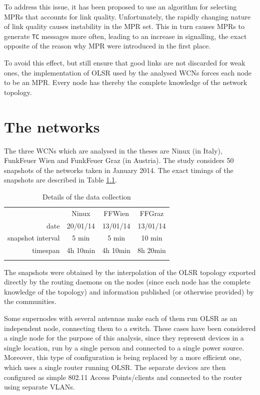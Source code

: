 \documentclass[a4paper,11pt,twoside,openright]{memoir}
\begin{document}
To address this issue, it has been proposed to use an algorithm for
selecting MPRs that accounts for link quality. Unfortunately, the
rapidly changing nature of link quality causes instability in the MPR
set. This in turn causes MPRs to generate \texttt{TC} messages more
often, leading to an increase in signalling, the exact opposite of the
reason why MPR were introduced in the first place.

To avoid this effect, but still ensure that good links are not discarded
for weak ones, the implementation of OLSR used by the analysed WCNs
forces each node to be an MPR\cite{maccari_analysis_2013}. Every node has
thereby the complete knowledge of the network topology.

\chapter{The networks}\label{the-networks}

The three WCNs which are analysed in the theses are Ninux (in Italy),
FunkFeuer Wien and FunkFeuer Graz (in Austria). The study considers 50
snapshots of the networks taken in January 2014. The exact timings of the
snapshots are described in Table \ref{tbl:snapshots}.

\begin{table}
  \centering
  \begin{tabular}{@{}rccc@{}}
  \toprule\addlinespace
  & Ninux & FFWien & FFGraz
  \\\addlinespace
  \midrule
  date & 20/01/14 & 13/01/14 & 13/01/14
  \\\addlinespace
  snapshot interval & 5 min & 5 min & 10 min
  \\\addlinespace
  timespan & 4h 10min & 4h 10min & 8h 20min
  \\\addlinespace
  \bottomrule
  \addlinespace
  \end{tabular}
  \caption{Details of the data collection}
  \label{tbl:snapshots}
\end{table}

The snapshots were obtained by the interpolation of the OLSR topology
exported directly by the routing daemons on the nodes (since each node
has the complete knowledge of the topology) and information published
(or otherwise provided) by the communities.

Some supernodes with several antennas make each of them run OLSR as an
independent node, connecting them to a switch. These cases have been
considered a single node for the purpose of this analysis, since they
represent devices in a single location, run by a single person and
connected to a single power source. Moreover, this type of configuration
is being replaced by a more efficient one, which uses a single router
running OLSR. The separate devices are then configured as simple 802.11
Access Points/clients and connected to the router using separate VLANs.
\end{document}
